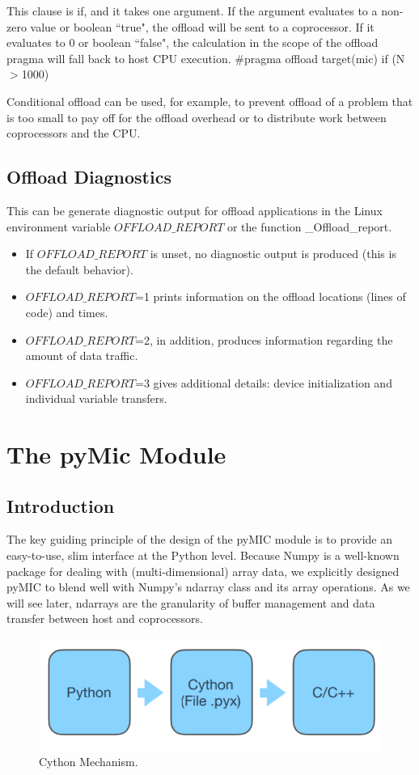 \documentclass[12pt]{article}
\begin{document}
This clause is if, and it takes one argument. If the argument evaluates to a non-zero value or boolean ``true", the offload will be sent to a coprocessor. If it evaluates to 0 or boolean ``false", the calculation in the scope of the offload pragma will fall back to host CPU execution.
\#pragma offload target(mic) if (N$>$1000)

Conditional offload can be used, for example, to prevent offload of a problem that is too small to pay off for the offload overhead or to distribute work between coprocessors and the CPU.

\subsection{Offload Diagnostics}
This can be generate diagnostic output for offload applications in the Linux environment variable $OFFLOAD\_REPORT$ or the function \_Offload\_report.
\begin{itemize}
\item If $OFFLOAD\_REPORT$ is unset, no diagnostic output is produced (this is
the default behavior).
\item $OFFLOAD\_REPORT$=1 prints information on the offload locations (lines
of code) and times.
\item $OFFLOAD\_REPORT$=2, in addition, produces information regarding the
amount of data traffic.
\item $OFFLOAD\_REPORT$=3 gives additional details: device initialization and
individual variable transfers.
\end{itemize}

\section{The pyMic Module}
\subsection{Introduction}
The key guiding principle of the design of the pyMIC module is to provide an easy-to-use, slim interface at the Python level. Because Numpy is a well-known package for dealing with (multi-dimensional) array data, we explicitly designed pyMIC to blend well with Numpy's ndarray class and its array operations. As we will see later, ndarrays are the granularity of buffer management and data transfer between host and coprocessors.
\begin{figure}[H]
\centering
\includegraphics[scale = 0.9]{chainer23.png}
\caption{Cython Mechanism.}
\end{figure}
\end{document}
